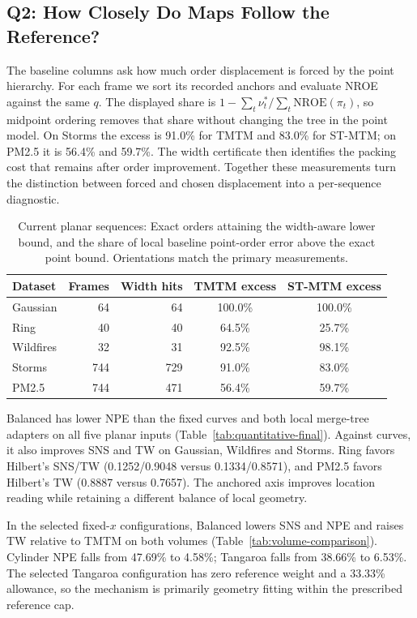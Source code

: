 \documentclass[review]{vgtc}
\newcommand{\nroe}{\mathrm{NROE}}
\begin{document}
\subsection{Q2: How Closely Do Maps Follow the Reference?}\label{sec:reference-results}
The baseline columns ask how much order displacement is forced by the point hierarchy. For each frame we sort its recorded anchors and evaluate NROE against the same $q$. The displayed share is $1-\sum_t\nu_t^*/\sum_t\nroe(\pi_t)$, so midpoint ordering removes that share without changing the tree in the point model. On Storms the excess is 91.0\% for TMTM and 83.0\% for ST-MTM; on PM2.5 it is 56.4\% and 59.7\%. The width certificate then identifies the packing cost that remains after order improvement. Together these measurements turn the distinction between forced and chosen displacement into a per-sequence diagnostic.
\begin{table}[!tb]
\centering\caption{Current planar sequences: Exact orders attaining the width-aware lower bound, and the share of local baseline point-order error above the exact point bound. Orientations match the primary measurements.}\label{tab:real-bounds}
\footnotesize\setlength{\tabcolsep}{3pt}
\begin{tabular}{@{}lrrcc@{}}\toprule
Dataset & Frames & Width hits & TMTM excess & ST-MTM excess\\\midrule
Gaussian & 64 & 64 & 100.0\% & 100.0\% \\
Ring & 40 & 40 & 64.5\% & 25.7\% \\
Wildfires & 32 & 31 & 92.5\% & 98.1\% \\
Storms & 744 & 729 & 91.0\% & 83.0\% \\
PM2.5 & 744 & 471 & 56.4\% & 59.7\% \\
\bottomrule\end{tabular}\end{table}

Balanced has lower NPE than the fixed curves and both local merge-tree adapters on all five planar inputs (Table~\ref{tab:quantitative-final}). Against curves, it also improves SNS and TW on Gaussian, Wildfires and Storms. Ring favors Hilbert's SNS/TW (0.1252/0.9048 versus 0.1334/0.8571), and PM2.5 favors Hilbert's TW (0.8887 versus 0.7657). The anchored axis improves location reading while retaining a different balance of local geometry.


In the selected fixed-$x$ configurations, Balanced lowers SNS and NPE and raises TW relative to TMTM on both volumes (Table~\ref{tab:volume-comparison}). Cylinder NPE falls from 47.69\% to 4.58\%; Tangaroa falls from 38.66\% to 6.53\%. The selected Tangaroa configuration has zero reference weight and a 33.33\% allowance, so the mechanism is primarily geometry fitting within the prescribed reference cap.
\end{document}

